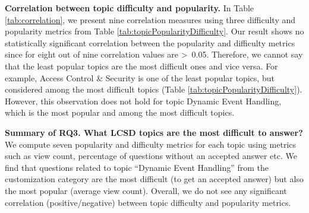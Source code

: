 \nd\textbf{Correlation between topic difficulty and popularity.} 
In Table \ref{tab:correlation}, we present nine
correlation measures using three difficulty and popularity metrics from Table
\ref{tab:topicPopularityDifficulty}. Our result shows no
statistically significant correlation between the popularity and difficulty
metrics since for eight out of nine correlation values are \textgreater~0.05. Therefore, we cannot say that the least popular topics are the most difficult
ones and vice versa. For example, Access Control \& Security is one of
the least popular topics, but considered among the most difficult topics (Table
\ref{tab:topicPopularityDifficulty}). However, this observation does not hold for
topic Dynamic Event Handling, which is the most popular and among
the most difficult topics.  


\begin{tcolorbox}[flushleft upper,boxrule=1pt,arc=0pt,left=0pt,right=0pt,top=0pt,bottom=0pt,colback=white,after=\ignorespacesafterend\par\noindent]
\noindent\textbf{Summary of RQ3. What LCSD topics are the most difficult to answer?} We compute seven popularity and difficulty metrics for each topic using metrics such as  
view count, percentage of questions without an accepted answer etc. We find that questions related to topic ``Dynamic Event Handling'' from the 
customization category are the most difficult (to get an accepted answer) but also the most popular (average view count). Overall, we do not see any significant correlation (positive/negative) between topic difficulty and popularity metrics. 
\end{tcolorbox}
